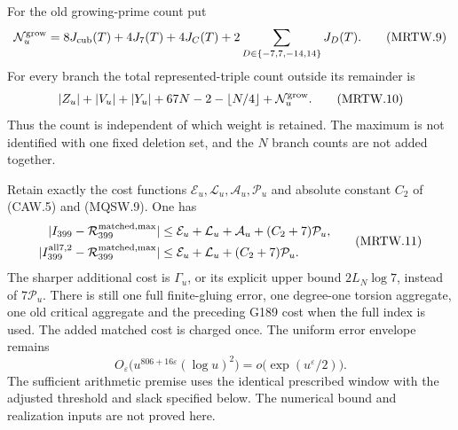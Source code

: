 \begin{theorem}
For the old growing-prime count put
\[
 \mathcal N_u^{\rm grow}=8J_{\rm cub}(T)+4J_7(T)+4J_C(T)
                       +2\sum_{D\in\{-7,7,-14,14\}}J_D(T).
 \tag{MRTW.9}
\]
For every branch the total represented-triple count outside its
remainder is
\[
 \begin{gathered}
 |Z_u|+|V_u|+|Y_u|+67N-2-\lfloor N/4\rfloor
                                      +\mathcal N_u^{\rm grow}.
 \end{gathered}\tag{MRTW.10}
\]
Thus the count is independent of which weight is retained.
The maximum is not identified with one fixed deletion set, and
the $N$ branch counts are not added together.

Retain exactly the cost functions $\mathcal E_u,\mathcal L_u,
\mathcal A_u,\mathcal P_u$ and absolute constant $C_2$ of
(CAW.5) and (MQSW.9). One has
\[
 \begin{aligned}
 |I_{399}-\mathcal R_{399}^{\rm matched,max}|&\leq
     \mathcal E_u+\mathcal L_u+\mathcal A_u
                                      +(C_2+7)\mathcal P_u,\\
 |I_{399}^{\rm all7,2}-\mathcal R_{399}^{\rm matched,max}|&\leq
     \mathcal E_u+\mathcal L_u+(C_2+7)\mathcal P_u.
 \end{aligned}\tag{MRTW.11}
\]
The sharper additional cost is $\Gamma_u$, or its explicit upper
bound $2L_N\log7$, instead of $7\mathcal P_u$.
There is still one full finite-gluing error, one degree-one torsion
aggregate, one old critical aggregate and the preceding G189 cost
when the full index is used. The added matched cost is charged once.
The uniform error envelope remains
\[
 O_\varepsilon\bigl(u^{806+16\varepsilon}(\log u)^2\bigr)
                         =o\bigl(\exp(u^\varepsilon/2)\bigr).
 \tag{MRTW.12}
\]
The sufficient arithmetic premise uses the identical prescribed
window with the adjusted threshold and slack specified below.
The numerical bound and realization inputs are not proved here.
\end{theorem}

